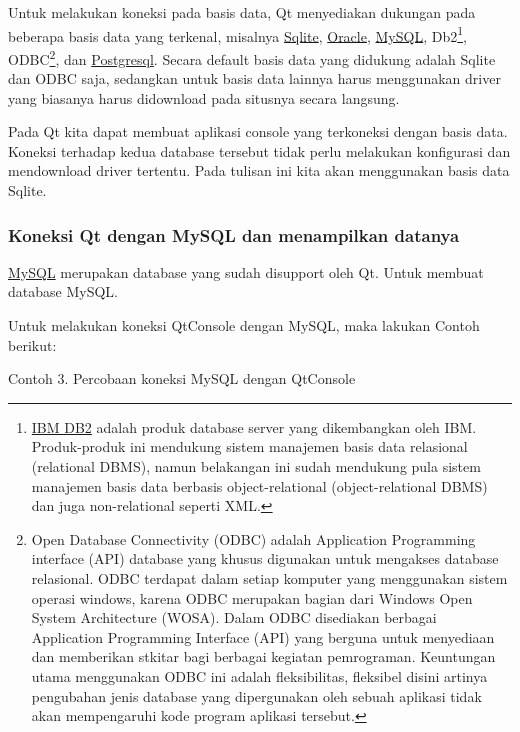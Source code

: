 Untuk melakukan koneksi pada basis data, Qt menyediakan dukungan pada
beberapa basis data yang terkenal, misalnya
\href{https://www.sqlite.org/about.html}{Sqlite},
\href{https://en.wikipedia.org/wiki/Oracle_Database}{Oracle},
\href{https://www.mysql.com/about/}{MySQL}, Db2\footnote{\href{https://en.wikipedia.org/wiki/IBM_DB2}{IBM
  DB2} adalah produk database server yang dikembangkan oleh IBM.
  Produk-produk ini mendukung sistem manajemen basis data relasional
  (relational DBMS), namun belakangan ini sudah mendukung pula sistem
  manajemen basis data berbasis object-relational (object-relational
  DBMS) dan juga non-relational seperti XML.}, ODBC\footnote{Open
  Database Connectivity (ODBC) adalah Application Programming interface
  (API) database yang khusus digunakan untuk mengakses database
  relasional. ODBC terdapat dalam setiap komputer yang menggunakan
  sistem operasi windows, karena ODBC merupakan bagian dari Windows Open
  System Architecture (WOSA). Dalam ODBC disediakan berbagai Application
  Programming Interface (API) yang berguna untuk menyediaan dan
  memberikan stkitar bagi berbagai kegiatan pemrograman. Keuntungan
  utama menggunakan ODBC ini adalah fleksibilitas, fleksibel disini
  artinya pengubahan jenis database yang dipergunakan oleh sebuah
  aplikasi tidak akan mempengaruhi kode program aplikasi tersebut.}, dan
\href{https://id.wikipedia.org/wiki/PostgreSQL}{Postgresql}. Secara
default basis data yang didukung adalah Sqlite dan ODBC saja, sedangkan
untuk basis data lainnya harus menggunakan driver yang biasanya harus
didownload pada situsnya secara langsung.

Pada Qt kita dapat membuat aplikasi console yang terkoneksi dengan basis
data. Koneksi terhadap kedua database tersebut tidak perlu melakukan
konfigurasi dan mendownload driver tertentu. Pada tulisan ini kita akan
menggunakan basis data Sqlite.

\subsubsection{Koneksi Qt dengan MySQL dan menampilkan
datanya}\label{koneksi-qt-dengan-mysql-dan-menampilkan-datanya}

\href{https://www.mysql.com/}{MySQL} merupakan database yang sudah
disupport oleh Qt. Untuk membuat database MySQL.

Untuk melakukan koneksi QtConsole dengan MySQL, maka lakukan Contoh
berikut:

Contoh 3. Percobaan koneksi MySQL dengan QtConsole

